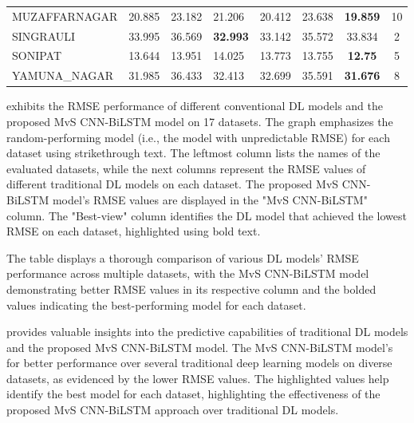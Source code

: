 \documentclass[a4paper, fleqn]{cas-sc}
\theoremstyle{definition}
\theoremstyle{remark}
\begin{document}
\begin{table}[]
{\begin{tabular}{llllllcc}
 MUZAFFARNAGAR  & 20.885          & 23.182    & 21.206          & 20.412     & 23.638                   & \textbf{19.859} & 10     \\
 SINGRAULI      & 33.995          & 36.569    & \textbf{32.993} & 33.142     & 35.572                    & 33.834          & 2      \\
 SONIPAT        & 13.644          & 13.951    & 14.025          & 13.773     & 13.755                    & \textbf{12.75}  & 5      \\
 YAMUNA\_NAGAR  & 31.985          & 36.433    & 32.413          & 32.699     & 35.591                    & \textbf{31.676} & 8     \\ \hline
  \end{tabular}%
  }
  \end{table}
   exhibits the RMSE performance of different conventional DL models and the proposed MvS CNN-BiLSTM model on 17 datasets. The graph emphasizes the random-performing model (i.e.,  the model with unpredictable RMSE) for each dataset using strikethrough text. The leftmost column lists the names of the evaluated datasets,  while the next columns represent the RMSE values of different traditional DL models on each dataset. The proposed MvS CNN-BiLSTM model's RMSE values are displayed in the "MvS CNN-BiLSTM" column. The "Best-view" column identifies the DL model that achieved the lowest RMSE on each dataset,  highlighted using bold text.

  The table displays a thorough comparison of various DL models' RMSE performance across multiple datasets,  with the MvS CNN-BiLSTM model demonstrating better RMSE values in its respective column and the bolded values indicating the best-performing model for each dataset.
  
   provides valuable insights into the predictive capabilities of traditional DL models and the proposed MvS CNN-BiLSTM model. The MvS CNN-BiLSTM model's for better performance over several traditional deep learning models on diverse datasets,  as evidenced by the lower RMSE values. The highlighted values help identify the best model for each dataset,  highlighting the effectiveness of the proposed MvS CNN-BiLSTM approach over traditional DL models.
\end{document}
